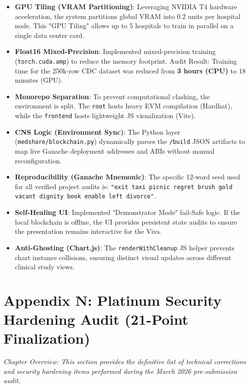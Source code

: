 \documentclass[10pt, a4paper, twocolumn]{article}
\begin{document}
\begin{itemize}[leftmargin=1.5em]
    \item \textbf{GPU Tiling (VRAM Partitioning)}: Leveraging NVIDIA T4 hardware acceleration, the system partitions global VRAM into 0.2 units per hospital node. This "GPU Tiling" allows up to 5 hospitals to train in parallel on a single data center card.
    \item \textbf{Float16 Mixed-Precision}: Implemented mixed-precision training (\texttt{torch.cuda.amp}) to reduce the memory footprint. Audit Result: Training time for the 250k-row CDC dataset was reduced from \textbf{3 hours (CPU)} to 18 minutes (GPU).
    \item \textbf{Monorepo Separation}: To prevent computational clashing, the environment is split. The \texttt{root} hosts heavy EVM compilation (Hardhat), while the \texttt{frontend} hosts lightweight JS visualization (Vite).
    \item \textbf{CNS Logic (Environment Sync)}: The Python layer (\texttt{medshare/blockchain.py}) dynamically parses the \texttt{/build} JSON artifacts to map live Ganache deployment addresses and ABIs without manual reconfiguration.
    \item \textbf{Reproducibility (Ganache Mnemonic)}: The specific 12-word seed used for all verified project audits is: \texttt{"exit taxi picnic regret brush gold vacant dignity book enable left divorce"}.
    \item \textbf{Self-Healing UI}: Implemented "Demonstrator Mode" fail-Safe logic. If the local blockchain is offline, the UI provides persistent state audits to ensure the presentation remains interactive for the Viva.
    \item \textbf{Anti-Ghosting (Chart.js)}: The \texttt{renderWithCleanup} JS helper prevents chart instance collisions, ensuring distinct visual updates across different clinical study views.
\end{itemize}

\section*{Appendix N: Platinum Security Hardening Audit (21-Point Finalization)}
\textit{Chapter Overview: This section provides the definitive list of technical corrections and security hardening items performed during the March 2026 pre-submission audit.}
\end{document}
